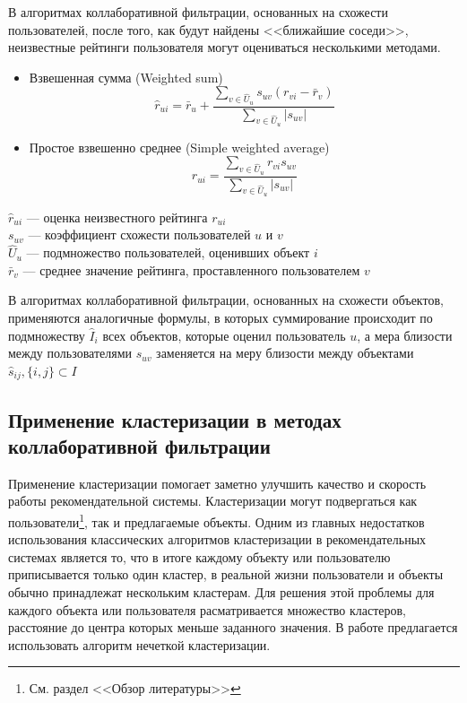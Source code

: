 \documentclass[a4paper, 12pt]{article} %
\begin{document}
В алгоритмах коллаборативной фильтрации, основанных на схожести пользователей, после того, как будут найдены <<ближайшие соседи>>, неизвестные рейтинги пользователя могут оцениваться несколькими методами. 
\begin{itemize}
\item Взвешенная сумма (Weighted sum)
\[
	\hat{r}_{ui} = \bar{r}_{u} + \frac{\sum_{v \in \hat{U}_{u}} s_{uv}(r_{vi} - \bar{r}_v)}{\sum_{v \in \hat{U}_{u}} |s_{uv}|}
\]

\item Простое взвешенно среднее (Simple weighted average)
\[
	\hat{r}_{ui} = \frac{\sum_{v \in \hat{U}_{u}} r_{vi} s_{uv}}{\sum_{v \in \hat{U}_{u}}|s_{uv}|}
\]
\end{itemize}
$\hat{r}_{ui}$ --- оценка неизвестного рейтинга $r_{ui}$
\\
$s_{uv}$ --- коэффициент схожести пользователей $u$ и $v$
\\
$\hat{U}_{u}$ --- подмножество пользователей, оценивших объект $i$
\\
$\bar{r}_v$ --- среднее значение рейтинга, проставленного пользователем $v$
\par В алгоритмах коллаборативной фильтрации, основанных на схожести объектов, применяются аналогичные формулы, в которых суммирование происходит по подмножеству $\hat{ I}_{i}$ всех объектов, которые оценил пользователь $u$, а мера близости между пользователями $s_{uv}$ заменяется на меру близости между объектами $\hat{s}_{ij}, \{i, j\} \subset I$ 


\subsection{Применение кластеризации в методах коллаборативной фильтрации}
Применение кластеризации помогает заметно улучшить качество и скорость работы рекомендательной системы\cite{clustersearch}. Кластеризации могут подвергаться как пользователи\footnote{См. раздел <<Обзор литературы>>}, так и предлагаемые объекты\cite{clusteritemcf}. Одним из главных недостатков использования классических алгоритмов кластеризации в рекомендательных системах является то, что в итоге каждому объекту или пользователю приписывается только один кластер, в реальной жизни пользователи и объекты обычно принадлежат нескольким кластерам. Для решения этой проблемы для каждого объекта или пользователя расматривается множество кластеров, расстояние до центра которых меньше заданного значения. В работе предлагается использовать алгоритм нечеткой кластеризации.
\end{document}
